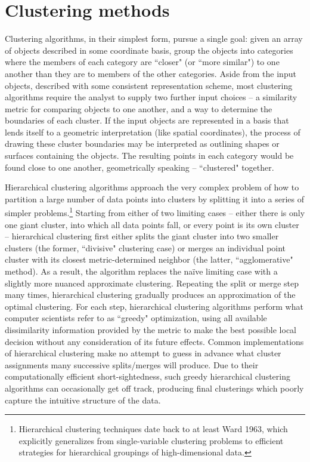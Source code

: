 \section{Clustering methods}
Clustering algorithms, in their simplest form, pursue a single goal: given an array of objects described in some coordinate basis, group the objects into categories where the members of each category are ``closer" (or ``more similar") to one another than they are to members of the other categories.  Aside from the input objects, described with some consistent representation scheme, most clustering algorithms require the analyst to supply two further input choices -- a similarity metric for comparing objects to one another, and a way to determine the boundaries of each cluster.  If the input objects are represented in a basis that lends itself to a geometric interpretation (like spatial coordinates), the process of drawing these cluster boundaries may be interpreted as outlining shapes or surfaces containing the objects.  The resulting points in each category would be found close to one another, geometrically speaking -- ``clustered" together.

Hierarchical clustering algorithms approach the very complex problem of how to partition a large number of data points into clusters by splitting it into a series of simpler problems.\footnote{Hierarchical clustering techniques date back to at least Ward 1963, which explicitly generalizes from single-variable clustering problems to efficient strategies for hierarchical groupings of high-dimensional data.}  Starting from either of two limiting cases -- either there is only one giant cluster, into which all data points fall, or every point is its own cluster -- hierarchical clustering first either splits the giant cluster into two smaller clusters (the former, ``divisive" clustering case) or merges an individual point cluster with its closest metric-determined neighbor (the latter, ``agglomerative"  method).  As a result, the algorithm replaces the na\"{i}ve limiting case with a slightly more nuanced approximate clustering.  Repeating the split or merge step many times, hierarchical clustering gradually produces an approximation of the optimal clustering.  For each step, hierarchical clustering algorithms perform what computer scientists refer to as ``greedy" optimization, using all available dissimilarity information provided by the metric to make the best possible local decision without any consideration of its future effects.  Common implementations of hierarchical clustering make no attempt to guess in advance what cluster assignments many successive splits/merges will produce.  Due to their computationally efficient short-sightedness, such greedy hierarchical clustering algorithms can occasionally get off track, producing final clusterings which poorly capture the intuitive structure of the data.

